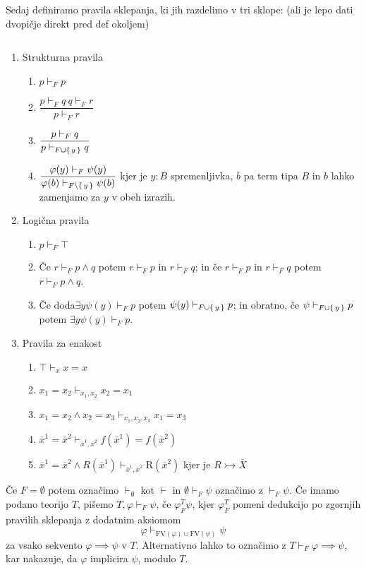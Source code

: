 \documentclass[../kategoricna_logika.tex]{subfiles}
\begin{document}
Sedaj definiramo pravila sklepanja, ki jih razdelimo v tri sklope: (ali je lepo dati dvopičje direkt pred def okoljem)
\begin{definicija}
  $ $
  \begin{enumerate}[label*=\arabic*.]
    \item Strukturna pravila
    \begin{enumerate}[label*=\arabic*.]
      \item $p \vdash_F p$
      \item $\dfrac{p \vdash_F q \ q \vdash_F r}{p \vdash_F r}$
      \item $\dfrac{p \vdash_F q}{p \vdash_{F \cup \left\lbrace\,y\,\right\rbrace} q}$
      \item $\dfrac{\varphi(y) \vdash_F \psi(y)}{\varphi(b) \vdash_{F\setminus\left\lbrace\,y\,\right\rbrace} \psi(b)}$
      kjer je $y : B$ spremenljivka, $b$ pa term tipa $B$ in $b$ lahko zamenjamo za $y$ v obeh izrazih.
    \end{enumerate}
    \item Logična pravila
    \begin{enumerate}[label*=\arabic*.]
      \item $p \vdash_F \top$
      \item Če $r \vdash_F p \wedge q$ potem $r \vdash_F p$ in $r \vdash_F q$; in če $r \vdash_F p$ in $r \vdash_F q$ potem $r \vdash_F p \wedge q$.
      \item Če doda$\exists y \psi(y) \vdash_F p$ potem $\psi(y) \vdash_{F \cup \left\lbrace\,y\,\right\rbrace} p$; in obratno, če $\psi \vdash_{F \cup \left\lbrace\,y\,\right\rbrace} p$ potem $\exists y \psi(y) \vdash_F p$.
    \end{enumerate}
    \item Pravila za enakost
    \begin{enumerate}[label*=\arabic*.]
      \item $\top \vdash_x x = x$
      \item $x_1 = x_2 \vdash_{x_1, x_2} x_2 = x_1$
      \item $x_1 = x_2 \wedge x_2 = x_3 \vdash_{x_1, x_2, x_3} x_1 = x_3$
      \item $\overline{x}^1 = \overline{x}^2 \vdash_{\overline{x}^1, \overline{x}^2} f(\overline{x}^1) = f(\overline{x}^2)$
      \item $\overline{x}^1 = \overline{x}^2 \wedge R(\overline{x}^1) \vdash_{\overline{x}^1, \overline{x}^2} \mathrm{R}(\overline{x}^2)$
      kjer je $R \rightarrowtail \overline{X}$
    \end{enumerate}
  \end{enumerate}
  Če $F = \emptyset$ potem označimo $\vdash_\emptyset$ kot $\vdash$ in $\emptyset \vdash_F \psi$ označimo z $\vdash_F \psi$.
  Če imamo podano teorijo $T$, pišemo $T, \varphi \vdash_F \psi$, če $\varphi_F^T \psi$, kjer $\varphi_F^T$ pomeni dedukcijo po zgornjih pravilih sklepanja z dodatnim aksiomom
  $$\varphi \vdash_{\mathrm{FV}(\varphi) \cup \mathrm{FV}(\psi)} \psi$$
  za vsako sekvento $\varphi \implies \psi$ v $T$. Alternativno lahko to označimo z $T \vdash_F \varphi \implies \psi$, kar nakazuje, da $\varphi$ implicira $\psi$, modulo $T$.
\end{definicija}
\begin{primer}[izpeljava]
  
\end{primer}
%
\end{document}
